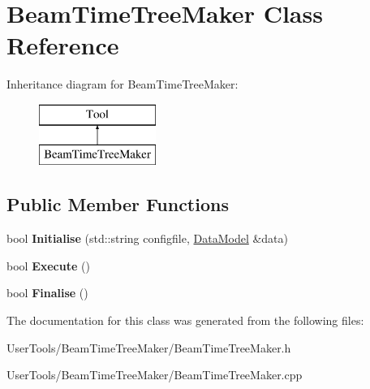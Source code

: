 \hypertarget{classBeamTimeTreeMaker}{\section{Beam\-Time\-Tree\-Maker Class Reference}
\label{classBeamTimeTreeMaker}
}
Inheritance diagram for Beam\-Time\-Tree\-Maker\-:\begin{figure}[H]
\begin{center}
\leavevmode
\includegraphics[height=2.000000cm]{classBeamTimeTreeMaker}
\end{center}
\end{figure}
\subsection*{Public Member Functions}
\begin{DoxyCompactItemize}
\item 
\hypertarget{classBeamTimeTreeMaker_ad0ff2ecf3cf282fc854c086f2bd6902e}{bool {\bfseries Initialise} (std\-::string configfile, \hyperlink{classDataModel}{Data\-Model} \&data)}\label{classBeamTimeTreeMaker_ad0ff2ecf3cf282fc854c086f2bd6902e}

\item 
\hypertarget{classBeamTimeTreeMaker_a9d8457a840bbd05785c6dbad41efc3e9}{bool {\bfseries Execute} ()}\label{classBeamTimeTreeMaker_a9d8457a840bbd05785c6dbad41efc3e9}

\item 
\hypertarget{classBeamTimeTreeMaker_aa854478ff70ed002e41ed38e18fe4a25}{bool {\bfseries Finalise} ()}\label{classBeamTimeTreeMaker_aa854478ff70ed002e41ed38e18fe4a25}

\end{DoxyCompactItemize}


The documentation for this class was generated from the following files\-:\begin{DoxyCompactItemize}
\item 
User\-Tools/\-Beam\-Time\-Tree\-Maker/Beam\-Time\-Tree\-Maker.\-h\item 
User\-Tools/\-Beam\-Time\-Tree\-Maker/Beam\-Time\-Tree\-Maker.\-cpp\end{DoxyCompactItemize}
